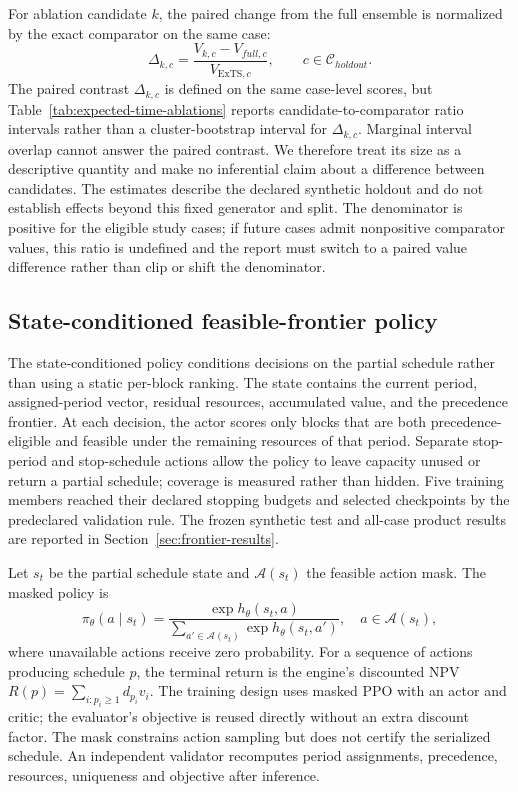 For ablation candidate $k$, the paired change from the full ensemble is normalized by the exact comparator on the same case:
\begin{equation}
 \Delta_{k,c}=\frac{V_{k,c}-V_{full,c}}{V_{\mathrm{ExTS},c}},
 \qquad c\in\mathcal C_{holdout}.
\end{equation}
The paired contrast $\Delta_{k,c}$ is defined on the same case-level scores, but Table~\ref{tab:expected-time-ablations} reports candidate-to-comparator ratio intervals rather than a cluster-bootstrap interval for $\Delta_{k,c}$. Marginal interval overlap cannot answer the paired contrast. We therefore treat its size as a descriptive quantity and make no inferential claim about a difference between candidates. The estimates describe the declared synthetic holdout and do not establish effects beyond this fixed generator and split. The denominator is positive for the eligible study cases; if future cases admit nonpositive comparator values, this ratio is undefined and the report must switch to a paired value difference rather than clip or shift the denominator.

\subsection{State-conditioned feasible-frontier policy}
\label{sec:method-frontier}
The state-conditioned policy conditions decisions on the partial schedule rather than using a static per-block ranking. The state contains the current period, assigned-period vector, residual resources, accumulated value, and the precedence frontier. At each decision, the actor scores only blocks that are both precedence-eligible and feasible under the remaining resources of that period. Separate stop-period and stop-schedule actions allow the policy to leave capacity unused or return a partial schedule; coverage is measured rather than hidden. Five training members reached their declared stopping budgets and selected checkpoints by the predeclared validation rule. The frozen synthetic test and all-case product results are reported in Section~\ref{sec:frontier-results}.

Let $s_t$ be the partial schedule state and $\mathcal A(s_t)$ the feasible action mask. The masked policy is
\begin{equation}
 \pi_\theta(a\mid s_t)=\frac{\exp h_\theta(s_t,a)}{\sum_{a'\in\mathcal A(s_t)}\exp h_\theta(s_t,a')},\quad a\in\mathcal A(s_t),
\end{equation}
where unavailable actions receive zero probability. For a sequence of actions producing schedule $p$, the terminal return is the engine's discounted NPV $R(p)=\sum_{i:p_i\geq1}d_{p_i}v_i$. The training design uses masked PPO with an actor and critic; the evaluator's objective is reused directly without an extra discount factor. The mask constrains action sampling but does not certify the serialized schedule. An independent validator recomputes period assignments, precedence, resources, uniqueness and objective after inference.

